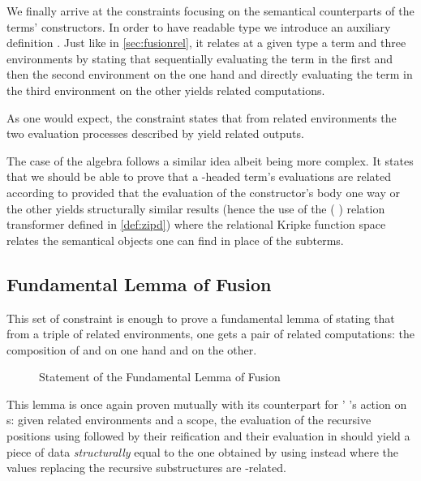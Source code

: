 
We finally arrive at the constraints focusing on the semantical counterparts
of the terms' constructors. In order to have readable type we introduce an
auxiliary definition . Just like in \cref{sec:fusionrel}, it relates at
a given type a term and three environments by stating that sequentially evaluating
the term in the first and then the second environment on the one hand and directly
evaluating the term in the third environment on the other yields related computations.


As one would expect, the  constraint states that from related environments
the two evaluation processes described by  yield related outputs.


The case of the algebra follows a similar idea albeit being more complex. It states
that we should be able to prove that a -headed term's evaluations are related
according to  provided that the evaluation of the constructor's body one way or
the other yields structurally similar results (hence the use of the ({ })
relation transformer defined in \cref{def:zipd}) where the relational Kripke function
space relates the semantical objects one can find in place of the subterms.


\subsection{Fundamental Lemma of Fusion}

This set of constraint is enough to prove a fundamental lemma of  stating
that from a triple of related environments, one gets a pair of related computations:
the composition of  and  on one hand and  on the other.

\begin{figure}[h]
\caption{Statement of the Fundamental Lemma of Fusion\label{fig:fusiontype}}
\end{figure}

This lemma is once again proven mutually with its counterpart for '
's action on s: given related environments and a scope, the
evaluation of the recursive positions using  followed by their reification
and their evaluation in  should yield a piece of data \emph{structurally}
equal to the one obtained by using  instead where the values replacing
the recursive substructures are -related.

